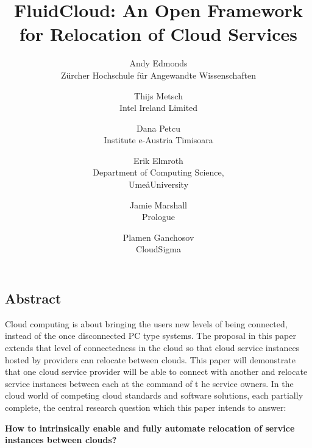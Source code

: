 \documentclass[letterpaper,twocolumn,10pt]{article}
\begin{document}
\date{}

\title{\Large \bf FluidCloud: An Open Framework for Relocation of Cloud Services}

\author{
{\rm Andy Edmonds}\\
Z\"urcher Hochschule f\"ur Angewandte Wissenschaften
\and
{\rm Thijs Metsch}\\
Intel Ireland Limited
\and
{\rm Dana Petcu}\\
Institute e-Austria Timisoara
\and
{\rm Erik Elmroth}\\
Department of Computing Science,\\Ume\aa  University
\and
{\rm Jamie Marshall}\\
Prologue
\and
{\rm Plamen Ganchosov}\\
CloudSigma
}

\maketitle


\subsection*{Abstract}

Cloud computing is about bringing the users new levels of being connected, 
instead of the once disconnected PC type systems. The proposal in this paper extends 
that level of connectedness in the cloud so that cloud service instances 
hosted by providers can relocate between clouds. This paper will 
demonstrate that one cloud service provider will be able to connect with 
another and relocate service instances between each at the command of t
he service owners. In the cloud world of competing cloud standards and 
software solutions, each partially complete, the central research question which this paper intends to answer:

\textbf{How to intrinsically enable and fully automate relocation of service instances between clouds?}
\end{document}
